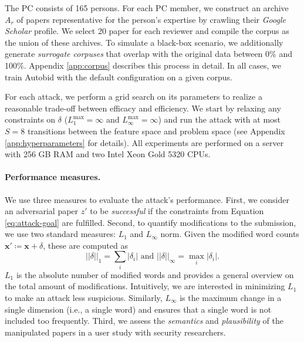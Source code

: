 \documentclass[letterpaper,twocolumn,10pt]{article}
\newcommand{\bow}{\textbf{x}}
\newcommand{\submission}{\bow}
\newcommand{\reviewer}{r}
\newcommand{\archive}{A}
\newcommand{\switches}{S}
\newcommand{\modifications}{\delta}
\newcommand{\modificationsmannorm}{{\left| \left| \modifications \right| \right|}_1}
\newcommand{\modificationsinfnorm}{{\left| \left| \modifications \right| \right|}_\infty}
\newcommand{\maxmannorm}{L_1^\text{max}}
\newcommand{\maxinfnorm}{L_\infty^\text{max}}
\newcommand{\inputpdf}{\ensuremath{z}\xspace}
\begin{document}
The PC consists of 165 persons. For each PC member, we construct an archive $\archive_\reviewer$ of papers representative for the person's expertise by crawling their \emph{Google Scholar} profile. We select 20 paper for each reviewer and compile the corpus as the union of these archives. To simulate a black-box scenario, we additionally generate \emph{surrogate corpuses} that overlap with the original data between 0\%  and 100\%. Appendix \ref{app:corpus} describes this process in detail. In all cases, we train Autobid with the default configuration on a given corpus.

For each attack, we perform a grid search on its parameters to realize a reasonable trade-off between efficacy and efficiency. We start by relaxing any constraints on $\modifications$ ($\maxmannorm = \infty$ and $\maxinfnorm = \infty$) and run the attack with at most $\switches = 8$ transitions between the feature space and problem space (see Appendix \ref{app:hyperparameters} for details).
All experiments are performed on a server with 256 GB RAM and two Intel {Xeon\EndAccSupp{}} Gold 5320 CPUs. 

\paragraph{Performance measures.} We use three measures to evaluate the attack's performance. First, we consider an adversarial paper $\inputpdf'$ to be \emph{successful} if the constraints from Equation \ref{eq:attack-goal} are fulfilled.
Second, to quantify modifications to the submission, we use two standard measures: $L_1$ and $L_\infty$ norm. Given the modified word counts $\submission' \coloneqq \submission + \modifications $, these are computed as
	\begin{equation}
	   \modificationsmannorm = \sum_{i}{\left| \modifications_i \right|} \text{ and } \modificationsinfnorm = \max_i \left| \modifications_i \right|.
	\end{equation}
$L_1$ is the absolute number of modified words and provides a general overview on the total amount of modifications. Intuitively, we are interested in minimizing $L_1$ to make an attack less suspicious. Similarly, $L_\infty$ is the maximum change in a single dimension (i.e., a single word) and ensures that a single word is not included too frequently. 
Third, we assess the \emph{semantics} and \emph{plausibility} of the manipulated papers in a user study with security researchers.
\end{document}
